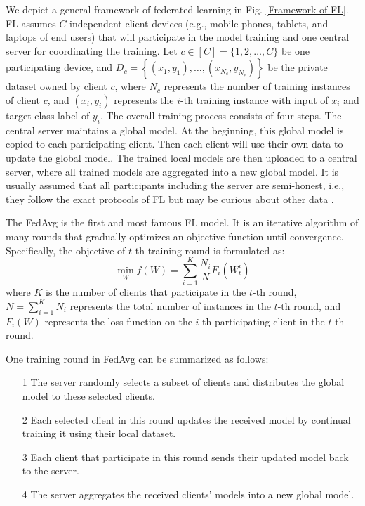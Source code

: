\documentclass[10pt,journal,compsoc]{IEEEtran}
\begin{document}
We depict a general framework of federated learning in Fig. \ref{Framework of FL}. FL assumes $C$ independent client devices (e.g., mobile phones, tablets, and laptops of end users) that will participate in the model training and one central server for coordinating the training. Let $c\in [C] = \{1, 2,\ldots,C\}$ be one participating device, and $ D_{c} = \left\lbrace  \left( x_{1}, y_{1} \right) , \dots  , \left( x_{N_c}, y_{N_c} \right)  \right\rbrace  $ be the private dataset owned by client $c$, where $N_c$ represents the number of training instances of client $c$, and $ (x_{i}, y_{i}) $ represents the $i$-th training instance with input of $x_{i}$ and target class label of $y_i$. The overall training process consists of four steps. The central server maintains a global model. At the beginning, this global model is copied to each participating client. Then each client will use their own data to update the global model. The trained local models are then uploaded to a central server, where all trained models are aggregated into a new global model. It is usually assumed that all participants including the server are semi-honest, i.e., they follow the exact protocols of FL but may be curious about other data \cite{li2021sample}. 

The FedAvg \cite{mcmahan2017communication} is the first and most famous FL model. It is an iterative algorithm of many rounds that gradually optimizes an objective function until convergence. Specifically, the objective of $t$-th training round is formulated as:
\begin{equation}
	\min _{W} f(W)=\sum_{i=1}^{K} \frac{N_i}{N} F_{i}(W_{t}^{i}) 
\end{equation}
where $ K $ is the number of clients that participate in the $t$-th round, $N=\sum_{i=1}^K N_i$ represents the total number of instances in the $t$-th round, and $ F_{i}(W) $ represents the loss function on the $i$-th participating client in the $t$-th round.

One training round in FedAvg can be summarized as follows:
\begin{itemize}
	\item[1] The server randomly selects a subset of clients and distributes the global model to these selected clients.
	\item[2] Each selected client in this round updates the received model by continual training it using their local dataset.
	\item[3] Each client that participate in this round sends their updated model back to the server.
	\item[4] The server aggregates the received clients' models into a new global model.
\end{itemize}
\end{document}
